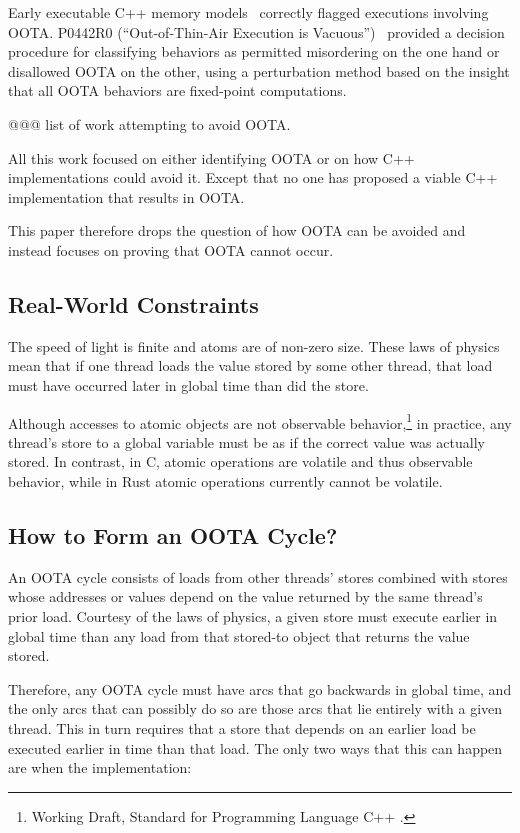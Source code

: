 \documentclass[10]{article}
\begin{document}
Early executable C++ memory models~\cite{MarkBatty2011cppmem}
correctly flagged executions involving OOTA.
P0442R0 (``Out-of-Thin-Air Execution is Vacuous'')~\cite{PaulEMcKenney2016OOTA}
provided a decision procedure for classifying behaviors as permitted
misordering on the one hand or disallowed OOTA on the other, using
a perturbation method based on the insight that all OOTA behaviors are
fixed-point computations.

@@@ list of work attempting to avoid OOTA.

All this work focused on either identifying OOTA or on how C++
implementations could avoid it.
Except that no one has proposed a viable C++ implementation that results
in OOTA.

This paper therefore drops the question of how OOTA can be avoided and
instead focuses on proving that OOTA cannot occur.

\subsection{Real-World Constraints}
\label{sec:Real-World Constraints}

The speed of light is finite and atoms are of non-zero size.
These laws of physics mean that if one thread loads the value
stored by some other thread, that load must have occurred later
in global time than did the store.

Although accesses to atomic objects are not observable behavior,\footnote{
	Working Draft, Standard for Programming Language C++
	.}
in practice, any thread's store to a global variable must be as if the
correct value was actually stored.
In contrast, in C, atomic operations are volatile and thus observable
behavior, while in Rust atomic operations currently cannot be volatile.

\subsection{How to Form an OOTA Cycle?}
\label{sec:How to Form an OOTA Cycle?}

An OOTA cycle consists of loads from other threads' stores combined
with stores whose addresses or values depend on the value returned
by the same thread's prior load.
Courtesy of the laws of physics, a given store must execute earlier
in global time than any load from that stored-to object that returns
the value stored.

Therefore, any OOTA cycle must have arcs that go backwards in global
time, and the only arcs that can possibly do so are those arcs that
lie entirely with a given thread.
This in turn requires that a store that depends on an earlier load
be executed earlier in time than that load.
The only two ways that this can happen are when the implementation:
\end{document}
